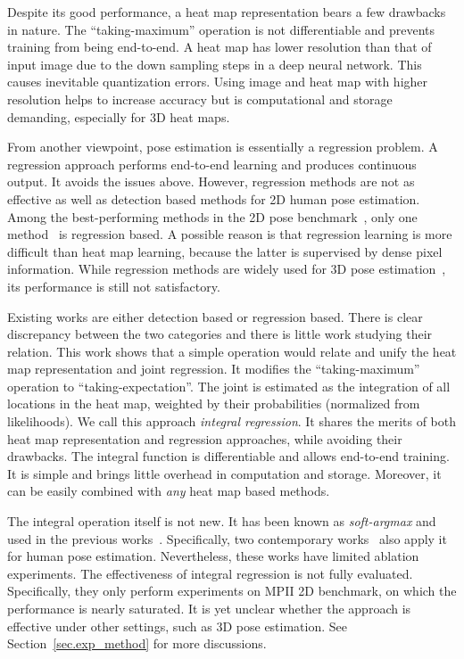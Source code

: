 \documentclass[runningheads]{llncs}
\begin{document}
Despite its good performance, a heat map representation bears a few drawbacks in nature. The ``taking-maximum'' operation is not differentiable and prevents training from being end-to-end. A heat map has lower resolution than that of input image due to the down sampling steps in a deep neural network. This causes inevitable quantization errors. Using image and heat map with higher resolution helps to increase accuracy but is computational and storage demanding, especially for 3D heat maps. 

From another viewpoint, pose estimation is essentially a regression problem. A regression approach performs end-to-end learning and produces continuous output. It avoids the issues above. However, regression methods are not as effective as well as detection based methods for 2D human pose estimation. Among the best-performing methods in the 2D pose benchmark~\cite{mpiiwebpage}, only one method~\cite{carreira2016human} is regression based. A possible reason is that regression learning is more difficult than heat map learning, because the latter is supervised by dense pixel information. While regression methods are widely used for 3D pose estimation~\cite{sun2017compositional,zhou2017towards,zhou2016deep,mehta2016monocular,moreno20163d,martinez2017simple,nie2017monocular,tekin2017learning,hossain2017exploiting,dabral2017structure}, its performance is still not satisfactory.

Existing works are either detection based or regression based. There is clear discrepancy between the two categories and there is little work studying their relation. This work shows that a simple operation would relate and unify the heat map representation and joint regression. It modifies the ``taking-maximum'' operation to ``taking-expectation''. The joint is estimated as the integration of all locations in the heat map, weighted by their probabilities (normalized from likelihoods). We call this approach \emph{integral regression}. It shares the merits of both heat map representation and regression approaches, while avoiding their drawbacks. The integral function is differentiable and allows end-to-end training. It is simple and brings little overhead in computation and storage. Moreover, it can be easily combined with \emph{any} heat map based methods.

The integral operation itself is not new. It has been known as \emph{soft-argmax} and used in the previous works~\cite{levine2016end,yi2016lift,thewlis2017unsupervised}. Specifically, two contemporary works~\cite{luvizon2017human,nibali2018numerical} also apply it for human pose estimation. Nevertheless, these works have limited ablation experiments. The effectiveness of integral regression is not fully evaluated. Specifically, they only perform experiments on MPII 2D benchmark, on which the performance is nearly saturated. It is yet unclear whether the approach is effective under other settings, such as 3D pose estimation. See Section~\ref{sec.exp_method} for more discussions.
\end{document}

